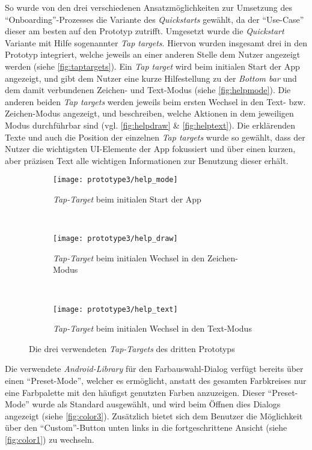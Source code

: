 So wurde von den drei verschiedenen Ansatzmöglichkeiten zur Umsetzung des ``Onboarding''-Prozesses die Variante des \emph{Quickstarts} gewählt, da der ``Use-Case'' dieser am besten auf den Prototyp zutrifft.
Umgesetzt wurde die \emph{Quickstart} Variante mit Hilfe sogenannter \emph{Tap targets}.
Hiervon wurden insgesamt drei in den Prototyp integriert, welche jeweils an einer anderen Stelle dem Nutzer angezeigt werden (siehe \autoref{fig:taptargets}).
Ein \emph{Tap target} wird beim initialen Start der App angezeigt, und gibt dem Nutzer eine kurze Hilfestellung zu der \emph{Bottom bar} und dem damit verbundenen Zeichen- und Text-Modus (siehe \autoref{fig:helpmode}).
Die anderen beiden \emph{Tap targets} werden jeweils beim ersten Wechsel in den Text- bzw. Zeichen-Modus angezeigt, und beschreiben, welche Aktionen in dem jeweiligen Modus durchführbar sind (vgl. \autoref{fig:helpdraw} \& \autoref{fig:helptext}).
Die erklärenden Texte und auch die Position der einzelnen \emph{Tap targets} wurde so gewählt, dass der Nutzer die wichtigsten UI-Elemente der App fokussiert und über einen kurzen, aber präzisen Text alle wichtigen Informationen zur Benutzung dieser erhält. \\

\begin{figure}[h]
	\begin{subfigure}[t]{0.3\textwidth}
		\centering
		\texttt{[image: prototype3/help\_mode]}
		\caption{\emph{Tap-Target} beim initialen Start der App}
		\label{fig:helpmode}
	\end{subfigure}
	~
	\begin{subfigure}[t]{0.3\textwidth}
		\centering
		\texttt{[image: prototype3/help\_draw]}
		\caption{\emph{Tap-Target} beim initialen Wechsel in den Zeichen-Modus}
		\label{fig:helpdraw}
	\end{subfigure}
	~
	\begin{subfigure}[t]{0.3\textwidth}
		\centering
		\texttt{[image: prototype3/help\_text]}
		\caption{\emph{Tap-Target} beim initialen Wechsel in den Text-Modus}
		\label{fig:helptext}
	\end{subfigure}
	\centering
	\caption{Die drei verwendeten \emph{Tap-Targets} des dritten Prototyps}
	\label{fig:taptargets}
\end{figure}

Die verwendete \emph{Android-Library} für den Farbauswahl-Dialog verfügt bereits über einen ``Preset-Mode'', welcher es ermöglicht, anstatt des gesamten Farbkreises nur eine Farbpalette mit den häufigst genutzten Farben anzuzeigen.
Dieser ``Preset-Mode'' wurde als Standard ausgewählt, und wird beim Öffnen dies Dialogs angezeigt (siehe \autoref{fig:color3}).
Zusätzlich bietet sich dem Benutzer die Möglichkeit über den ``Custom''-Button unten links in die fortgeschrittene Ansicht (siehe \autoref{fig:color1}) zu wechseln. \\

